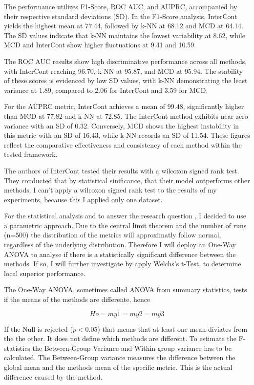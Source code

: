 The performance utilizes F1-Score, ROC AUC, and AUPRC, accompanied by their respective standard deviations (SD). 
In the F1-Score analysis, InterCont yields the highest mean at 77.44, followed by k-NN at 68.12 and MCD at 64.14. 
The SD values indicate that k-NN maintains the lowest variability at 8.62, while MCD and InterCont show higher fluctuations at 9.41 and 10.59.


The ROC AUC results show high discriminative performance across all methods, with InterCont reaching 96.70, k-NN at 95.87, and MCD at 95.94. 
The stability of these scores is evidenced by low SD values, with k-NN demonstrating the least variance at 1.89, compared to 2.06 for InterCont and 3.59 for MCD.


For the AUPRC metric, InterCont achieves a mean of 99.48, significantly higher than MCD at 77.82 and k-NN at 72.85. 
The InterCont method exhibits near-zero variance with an SD of 0.32. 
Conversely, MCD shows the highest instability in this metric with an SD of 16.43, while k-NN records an SD of 11.54. 
These figures reflect the comparative effectiveness and consistency of each method within the tested framework.



The authors of InterCont tested their results with a wilcoxon signed rank test. 
They conducted that by statistical sinificance, that their model outperforms other methods.
I can't apply a wilcoxon signed rank test to the results of my experiments, because this I applied only one dataset. 


For the statistical analysis and to answer the research question , I decided to use a parametric approach.
Due to the central limit theorem and the number of runs (n=500) the distribution of the metrics will approximatly follow normal, regardless of the underlying distribution. 
Therefore I will deploy an One-Way ANOVA to analyse if there is a statistically significant difference between the methods.
If so, I will further investigate by apply Welchs's t-Test, to determine local superior performance.


The One-Way ANOVA, sometimes called ANOVA from summary statistics, tests if the means of the methods are differente, hence

\begin{equation}
    Ho = my1 = my2 = my3
\end{equation}

If the Null is rejected ($p<0.05$) that means that at least one mean diviates from the the other. 
It does not define which methods are different.
To estimate the F-statistics the  Between-Group Variance and Within-group variance has to be calculated.
The Between-Group variance measures the difference between the global mean and the methods mean of the specific metric.
This is the actual difference caused by the method.


